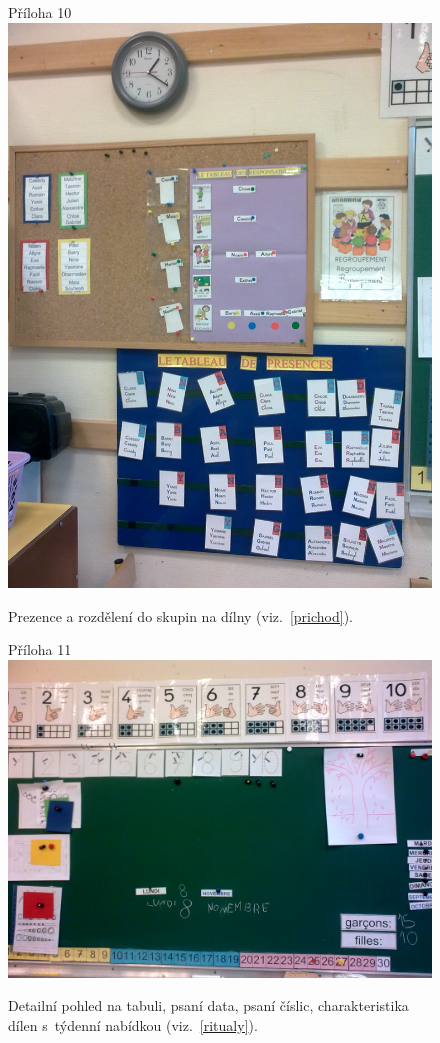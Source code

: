 	\begin{figure}[tb]
		\centering
		Příloha 10\\
		\includegraphics[height=0.35\textheight]{./fotky/Obr10.jpg}
		\caption{
			Prezence a rozdělení do skupin na dílny (viz.~\ref{prichod}).
		}
		\label{Obr10}
	\end{figure}

	\begin{figure}[tb]
		\centering
		Příloha 11\\
		\includegraphics[height=0.35\textheight]{./fotky/Obr11.jpg}
		\caption{
			Detailní pohled na tabuli, psaní data, psaní číslic, charakteristika dílen s~týdenní nabídkou  (viz.~\ref{ritualy}).
		}
		\label{Obr11}
	\end{figure}

